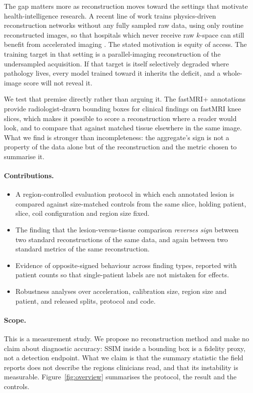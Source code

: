 \documentclass[letterpaper]{article} %
\begin{document}
The gap matters more as reconstruction moves toward the settings that motivate
health-intelligence research. A recent line of work trains physics-driven
reconstruction networks without any fully sampled raw data, using only routine
reconstructed images, so that hospitals which never receive raw $k$-space can
still benefit from accelerated imaging \citep{alcalar2025cupid}. The stated
motivation is equity of access. The training target in that setting is a
parallel-imaging reconstruction of the undersampled acquisition. If that target
is itself selectively degraded where pathology lives, every model trained toward
it inherits the deficit, and a whole-image score will not reveal it.

We test that premise directly rather than arguing it. The fastMRI+ annotations
\citep{zhao2021fastmriplus} provide radiologist-drawn bounding boxes for
clinical findings on fastMRI knee slices, which makes it possible to score a
reconstruction where a reader would look, and to compare that against matched
tissue elsewhere in the same image. What we find is stronger than incompleteness:
the aggregate's sign is not a property of the data alone but of the
reconstruction and the metric chosen to summarise it.

\paragraph{Contributions.}
\begin{itemize}
\item A region-controlled evaluation protocol in which each annotated lesion is
      compared against size-matched controls from the same slice, holding
      patient, slice, coil configuration and region size fixed.
\item The finding that the lesion-versus-tissue comparison \emph{reverses sign}
      between two standard reconstructions of the same data, and again between
      two standard metrics of the same reconstruction.
\item Evidence of opposite-signed behaviour across finding types, reported with
      patient counts so that single-patient labels are not mistaken for effects.
\item Robustness analyses over acceleration, calibration size, region size and
      patient, and released splits, protocol and code.
\end{itemize}

\paragraph{Scope.} This is a measurement study. We propose no reconstruction
method and make no claim about diagnostic accuracy: SSIM inside a bounding box
is a fidelity proxy, not a detection endpoint. What we claim is that the summary
statistic the field reports does not describe the regions clinicians read, and
that its instability is measurable. Figure~\ref{fig:overview} summarises the
protocol, the result and the controls.
\end{document}
